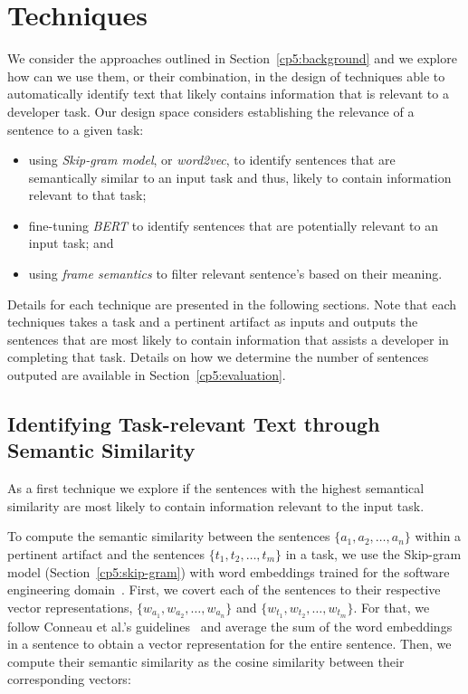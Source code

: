 \section{Techniques}
\label{cp5:approaches}




We consider the approaches outlined in Section~\ref{cp5:background} and we explore 
how can we use them, or their combination, in the design of techniques able to automatically identify text that likely contains information that is relevant to a developer task. 
Our design space considers establishing the relevance of a sentence to a given task:

\begin{itemize}
    \item using \textit{Skip-gram model}, or \textit{word2vec}, to identify sentences that are semantically similar to an input task and thus, likely to contain information relevant to that task;
    
    \item fine-tuning \textit{BERT} to identify sentences that are potentially relevant to an input task; and

    \item using \textit{frame semantics} to filter relevant sentence's based on their meaning.
\end{itemize}


Details for each technique are presented in the following sections.
Note that each techniques takes a task and a pertinent artifact as inputs and outputs the sentences 
that are most likely to contain information that assists a developer in completing that task. 
Details on how we determine the number of sentences outputed are available in Section~\ref{cp5:evaluation}.



\subsection{Identifying Task-relevant Text through Semantic Similarity}
\label{cp5:approach-w2v}


As a first technique we explore if the sentences with the highest semantical similarity are most likely to contain information relevant to the input task. 


To compute the semantic similarity between the sentences $\{a_1, a_2, \dots, a_n\}$ within a pertinent artifact and the sentences $\{t_1, t_2, \dots, t_m\}$ in a task, we use the Skip-gram model (Section~\ref{cp5:skip-gram}) with word embeddings trained for the software engineering domain~\cite{Efstathiou2018}. First, we covert each of the sentences to their respective vector representations, $\{ w_{a_1}, w_{a_2}, \dots, w_{a_n}\}$ and $\{ w_{t_1}, w_{t_2}, \dots, w_{t_m}\}$. For that, we follow Conneau et al.'s guidelines~\cite{conneau2018} 
 and average the sum of the word embeddings in a sentence to obtain a vector representation for the entire sentence.
Then, we compute their semantic similarity as the cosine similarity  between their corresponding vectors:


